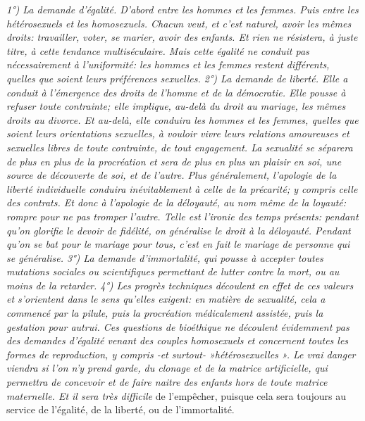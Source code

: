  \emph{1°) La demande d'égalité. D'abord entre les hommes et les femmes. Puis entre les hétérosexuels et les homosexuels. Chacun veut, et c'est naturel, avoir les mêmes droits: travailler, voter, se marier, avoir des enfants. Et rien ne résistera, à juste titre, à cette tendance multiséculaire. Mais cette égalité ne conduit pas nécessairement à l'uniformité: les hommes et les femmes restent différents, quelles que soient leurs préférences sexuelles. 
 2°) La demande de liberté. Elle a conduit à l'émergence des droits de l'homme et de la démocratie. Elle pousse à refuser toute contrainte; elle implique, au-delà du droit au mariage, les mêmes droits au divorce. Et au-delà, elle conduira les hommes et les femmes, quelles que soient leurs orientations sexuelles, à vouloir vivre leurs relations amoureuses et sexuelles libres de toute contrainte, de tout engagement. La sexualité se séparera de plus en plus de la procréation et sera de plus en plus un plaisir en soi, une source de découverte de soi, et de l'autre. Plus généralement, l'apologie de la liberté individuelle conduira inévitablement à celle de la précarité; y compris celle des contrats. Et donc à l'apologie de la déloyauté, au nom même de la loyauté: rompre pour ne pas tromper l'autre. Telle est l'ironie des temps présents: pendant qu'on glorifie le devoir de fidélité, on généralise le droit à la déloyauté. Pendant qu'on se bat pour le mariage pour tous, c'est en fait le mariage de personne qui se généralise.
 3°) La demande d'immortalité, qui pousse à accepter toutes mutations sociales ou scientifiques permettant de lutter contre la mort, ou au moins de la retarder.
 4°) Les progrès techniques découlent en effet de ces valeurs et s'orientent dans le sens qu'elles exigent: en matière de sexualité, cela a commencé par la pilule, puis la procréation médicalement assistée, puis la gestation pour autrui. Ces questions de bioéthique ne découlent évidemment pas des demandes d'égalité venant des couples homosexuels et concernent toutes les formes de reproduction, y compris -et surtout- »hétérosexuelles ». Le vrai danger viendra si l'on n'y prend garde, du clonage et de la matrice artificielle, qui permettra de concevoir et de faire naitre des enfants hors de toute matrice maternelle. Et il sera très difficile} de l'empêcher, puisque cela sera toujours au service de l'égalité, de la liberté, ou de l'immortalité.
